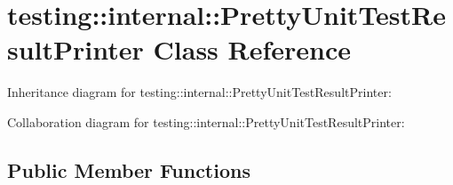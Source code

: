 \hypertarget{classtesting_1_1internal_1_1_pretty_unit_test_result_printer}{}\section{testing\+:\+:internal\+:\+:Pretty\+Unit\+Test\+Result\+Printer Class Reference}
\label{classtesting_1_1internal_1_1_pretty_unit_test_result_printer}


Inheritance diagram for testing\+:\+:internal\+:\+:Pretty\+Unit\+Test\+Result\+Printer\+:


Collaboration diagram for testing\+:\+:internal\+:\+:Pretty\+Unit\+Test\+Result\+Printer\+:
\subsection*{Public Member Functions}

